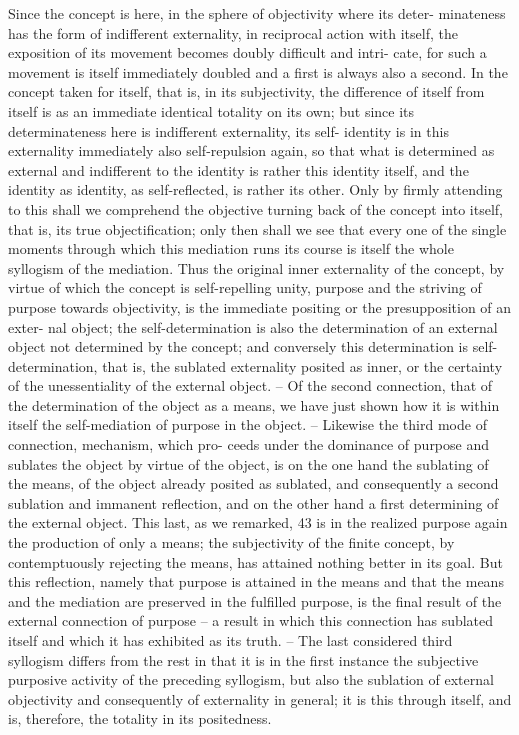 Since the concept is here, in the sphere of objectivity where its deter-
minateness has the form of indifferent externality, in reciprocal action with
itself, the exposition of its movement becomes doubly difficult and intri-
cate, for such a movement is itself immediately doubled and a first is always
also a second. In the concept taken for itself, that is, in its subjectivity, the
difference of itself from itself is as an immediate identical totality on its
own; but since its determinateness here is indifferent externality, its self-
identity is in this externality immediately also self-repulsion again, so that
what is determined as external and indifferent to the identity is rather this
identity itself, and the identity as identity, as self-reflected, is rather its
other. Only by firmly attending to this shall we comprehend the objective
turning back of the concept into itself, that is, its true objectification; only
then shall we see that every one of the single moments through which this
mediation runs its course is itself the whole syllogism of the mediation.
Thus the original inner externality of the concept, by virtue of which the
concept is self-repelling unity, purpose and the striving of purpose towards
objectivity, is the immediate positing or the presupposition of an exter-
nal object; the self-determination is also the determination of an external
object not determined by the concept; and conversely this determination
is self-determination, that is, the sublated externality posited as inner, or
the certainty of the unessentiality of the external object. – Of the second
connection, that of the determination of the object as a means, we have
just shown how it is within itself the self-mediation of purpose in the
object. – Likewise the third mode of connection, mechanism, which pro-
ceeds under the dominance of purpose and sublates the object by virtue
of the object, is on the one hand the sublating of the means, of the
object already posited as sublated, and consequently a second sublation
and immanent reflection, and on the other hand a first determining of
the external object. This last, as we remarked, 43 is in the realized purpose
again the production of only a means; the subjectivity of the finite concept,
by contemptuously rejecting the means, has attained nothing better in its
goal. But this reflection, namely that purpose is attained in the means and
that the means and the mediation are preserved in the fulfilled purpose, is
the final result of the external connection of purpose – a result in which this
connection has sublated itself and which it has exhibited as its truth. – The
last considered third syllogism differs from the rest in that it is in the first
instance the subjective purposive activity of the preceding syllogism, but
also the sublation of external objectivity and consequently of externality in
general; it is this through itself, and is, therefore, the totality in its positedness.

